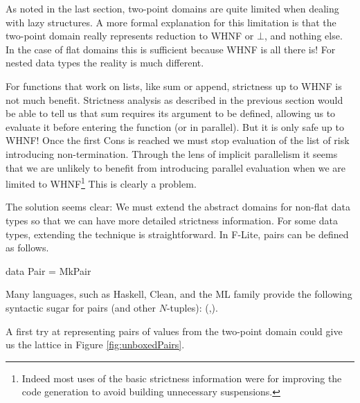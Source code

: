 As noted in the last section, two-point domains are quite limited when dealing
with lazy structures. A more formal explanation for this limitation is that the
two-point domain really represents reduction to WHNF or $\bot$, and nothing
else. In the case of flat domains this is sufficient because WHNF is all there
is! For nested data types the reality is much different. 

For functions that work on lists, like \<sum\> or \<append\>, strictness up to
WHNF is not much benefit. Strictness analysis as described in the previous
section would be able to tell us that \<sum\> requires its argument to be
defined, allowing us to evaluate it before entering the function (or in
parallel). But it is only safe up to WHNF! Once the first \<Cons\> is reached
we must stop evaluation of the list of risk introducing non-termination.
Through the lens of implicit parallelism it seems that we are unlikely to
benefit from introducing parallel evaluation when we are limited to
WHNF\footnote{Indeed most uses of the basic strictness information were for
improving the code generation to avoid building unnecessary suspensions.} This
is clearly a problem.

The solution seems clear: We must extend the abstract domains for non-flat data
types so that we can have more detailed strictness information. For some data
types, extending the technique is straightforward. In F-Lite, pairs can be
defined as follows.

\begin{haskell*}
data Pair \hasalpha \hasbeta = MkPair \hasalpha \hasbeta
\end{haskell*}

Many languages, such as Haskell, Clean, and the ML family provide the following
syntactic sugar for pairs (and other $N$-tuples): \<(\hasalpha,\hasbeta)\>.

A first try at representing pairs of values from the two-point domain could
give us the lattice in Figure \ref{fig:unboxedPairs}.

